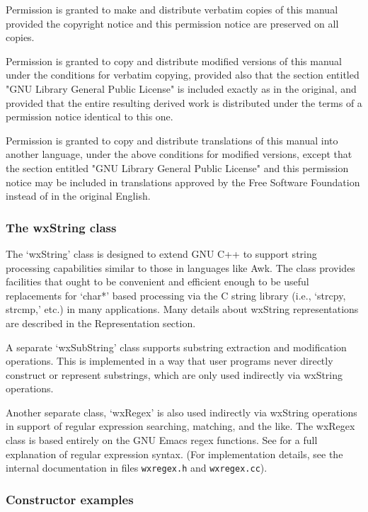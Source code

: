 Permission is granted to make and distribute verbatim copies of this
manual provided the copyright notice and this permission notice are
preserved on all copies.

Permission is granted to copy and distribute modified versions of
this manual under the conditions for verbatim copying, provided also
that the section entitled "GNU Library General Public License" is
included exactly as in the original, and provided that the entire
resulting derived work is distributed under the terms of a permission
notice identical to this one.

Permission is granted to copy and distribute translations of this
manual into another language, under the above conditions for modified
versions, except that the section entitled "GNU Library General Public
License" and this permission notice may be included in translations
approved by the Free Software Foundation instead of in the original
English.

\subsubsection{The wxString class}

The `wxString' class is designed to extend GNU C++ to support string
processing capabilities similar to those in languages like Awk. The
class provides facilities that ought to be convenient and efficient
enough to be useful replacements for `char*' based processing via the C
string library (i.e., `strcpy, strcmp,' etc.) in many applications.
Many details about wxString representations are described in the
Representation section.

A separate `wxSubString' class supports substring extraction and
modification operations. This is implemented in a way that user
programs never directly construct or represent substrings, which are
only used indirectly via wxString operations.

Another separate class, `wxRegex' is also used indirectly via wxString
operations in support of regular expression searching, matching, and the
like.  The wxRegex class is based entirely on the GNU Emacs regex
functions. See  
for a full explanation of regular expression syntax. (For
implementation details, see the internal documentation in files 
{\tt wxregex.h} and {\tt wxregex.cc}).

\subsubsection{Constructor examples}

